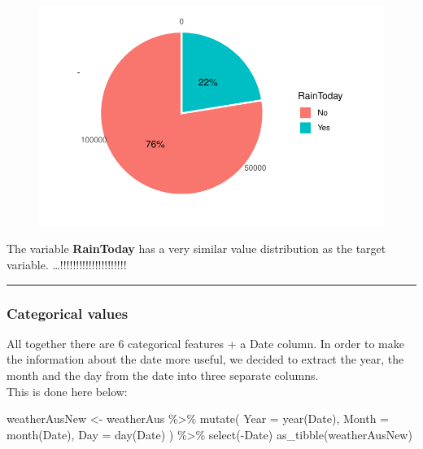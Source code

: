 \documentclass[
  letterpaper,
  DIV=11,
  numbers=noendperiod]{scrartcl}
\newenvironment{Shaded}{\begin{snugshade}}{\end{snugshade}}
\newcommand{\AttributeTok}[1]{\textcolor[rgb]{0.40,0.45,0.13}{#1}}
\newcommand{\FunctionTok}[1]{\textcolor[rgb]{0.28,0.35,0.67}{#1}}
\newcommand{\NormalTok}[1]{\textcolor[rgb]{0.00,0.23,0.31}{#1}}
\newcommand{\OtherTok}[1]{\textcolor[rgb]{0.00,0.23,0.31}{#1}}
\newcommand{\SpecialCharTok}[1]{\textcolor[rgb]{0.37,0.37,0.37}{#1}}
\begin{document}
\begin{figure}[H]

{\centering \includegraphics{RainAus_EDA_files/figure-pdf/unnamed-chunk-8-1.pdf}

}

\end{figure}

\hfill\break

The variable \textbf{RainToday} has a very similar value distribution as
the target variable. \ldots!!!!!!!!!!!!!!!!!!!!!

\begin{center}\rule{0.5\linewidth}{0.5pt}\end{center}

\hypertarget{categorical-values}{%
\subsubsection{Categorical values}\label{categorical-values}}

All together there are 6 categorical features + a Date column. In order
to make the information about the date more useful, we decided to
extract the year, the month and the day from the date into three
separate columns.\\
This is done here below:

\begin{Shaded}
\begin{Highlighting}[]
\NormalTok{weatherAusNew }\OtherTok{\textless{}{-}}\NormalTok{ weatherAus }\SpecialCharTok{\%\textgreater{}\%} \FunctionTok{mutate}\NormalTok{(}
  \AttributeTok{Year =} \FunctionTok{year}\NormalTok{(Date),}
  \AttributeTok{Month =} \FunctionTok{month}\NormalTok{(Date),}
  \AttributeTok{Day =} \FunctionTok{day}\NormalTok{(Date)}
\NormalTok{) }\SpecialCharTok{\%\textgreater{}\%} \FunctionTok{select}\NormalTok{(}\SpecialCharTok{{-}}\NormalTok{Date)}
\FunctionTok{as\_tibble}\NormalTok{(weatherAusNew)}
\end{Highlighting}
\end{Shaded}
\end{document}
